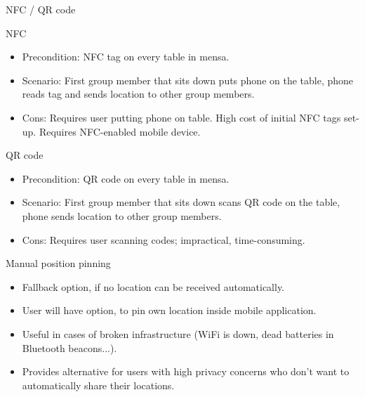 \documentclass[9pt]{beamer}
\begin{document}
\begin{frame}{NFC / QR code}

	NFC
	\begin{itemize}
	
		\item Precondition: NFC tag on every table in mensa.
		\item Scenario: First group member that sits down puts phone on the table, phone reads tag and sends location to other group members.
		\item Cons: Requires user putting phone on table. High cost of initial NFC tags set-up. Requires NFC-enabled mobile device.

	\end{itemize}
	
	\bigskip
	QR code
	\begin{itemize}
	
		\item Precondition: QR code on every table in mensa.
		\item Scenario: First group member that sits down scans QR code on the table, phone sends location to other group members.
		\item Cons: Requires user scanning codes; impractical, time-consuming. 

	\end{itemize}

\end{frame}

\begin{frame}{Manual position pinning}

	\begin{itemize}
	
		\item Fallback option, if no location can be received automatically.
		\item User will have option, to pin own location inside mobile application.
		\item Useful in cases of broken infrastructure (WiFi is down, dead batteries in Bluetooth beacons...).
		\item Provides alternative for users with high privacy concerns who don't want to automatically share their locations.

	\end{itemize}

\end{frame}
\end{document}
